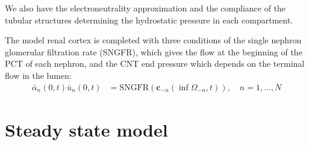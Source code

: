\documentclass{article}
\begin{document}
We also have the electroneutrality approximation and the compliance of the tubular structures determining the hydrostatic pressure in each compartment.

The model renal cortex is completed with three conditions of the single nephron glomerular filtration rate (SNGFR), which gives the flow at the beginning of the PCT of each nephron, and the CNT end pressure which depends on the terminal flow in the lumen:
\begin{align}
    \bar{\alpha}_n (0,t)\bar{u}_n(0,t) &= \mathrm{SNGFR}\left( \mathbf{c}_{-n}\left( \inf \Omega_{-n},t \right) \right),\quad n=1,\dots,N
\end{align}

\section{Steady state model}
\end{document}
